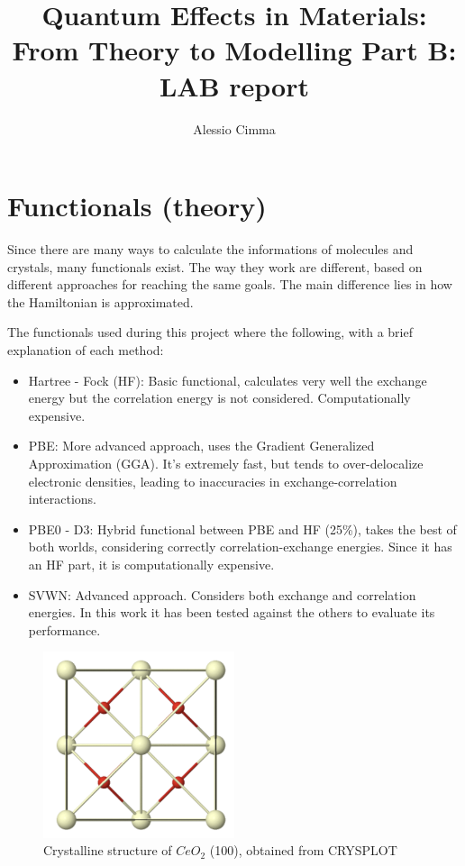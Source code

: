 \documentclass{article}
\title{Quantum Effects in Materials: From Theory to Modelling Part B: LAB report}
\author{Alessio Cimma}
\begin{document}
\maketitle

\tableofcontents
\newpage

\section{Functionals (theory)}

Since there are many ways to calculate the informations of molecules and crystals, many functionals exist.
The way they work are different, based on different approaches for reaching the same goals.
The main difference lies in how the Hamiltonian is approximated. 
 
The functionals used during this project where the following, with a brief explanation of each method:
\begin{itemize}
	\item Hartree - Fock (HF): Basic functional, calculates very well the exchange energy but the correlation energy is not considered. Computationally expensive.
	\item PBE: More advanced approach, uses the Gradient Generalized Approximation (GGA). It's extremely fast, but tends to over-delocalize electronic densities, leading to inaccuracies in exchange-correlation interactions.
	\item PBE0 - D3: Hybrid functional between PBE and HF (25\%), takes the best of both worlds, considering correctly correlation-exchange energies. Since it has an HF part, it is computationally expensive.
	\item SVWN: Advanced approach. Considers both exchange and correlation energies. In this work it has been tested against the others to evaluate its performance. 
\end{itemize}

\begin{figure}[ht]
	\centering
	\includegraphics[width=0.5\textwidth]{../images/crystal.png} 
	\caption{Crystalline structure of $CeO_2$ (100), obtained from CRYSPLOT}
	\label{fig:crystal_ce02}
\end{figure}
\end{document}
